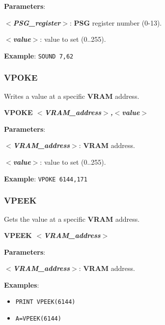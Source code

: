 \documentclass[a4paper,11pt]{article}
\begin{document}
    \textbf{Parameters}:

    \hspace{1cm}\textbf{\textit{$<$PSG\_register$>$}}: \textbf{PSG} register
    number (0-13).

    \hspace{1cm}\textbf{\textit{$<$value$>$}}: value to set (0..255).

    \textbf{Example}: \texttt{SOUND 7,62}

    \subsubsection{{\color{blue}VPOKE}}
    Writes a value at a specific \textbf{VRAM} address.

    \hspace{1.9cm}\textbf{VPOKE \textit{$<$VRAM\_address$>$,$<$value$>$}}

    \textbf{Parameters}:

    \hspace{1cm}\textbf{\textit{$<$VRAM\_address$>$}}: \textbf{VRAM} address.

    \hspace{1cm}\textbf{\textit{$<$value$>$}}: value to set (0..255).

    \textbf{Example}: \texttt{VPOKE 6144,171}

    \subsubsection{{\color{blue}VPEEK}}
    Gets the value at a specific \textbf{VRAM} address.

    \hspace{1.9cm}\textbf{VPEEK \textit{$<$VRAM\_address$>$}}

    \textbf{Parameters}:

    \hspace{1cm}\textbf{\textit{$<$VRAM\_address$>$}}: \textbf{VRAM} address.

    \textbf{Examples}:
    \begin{itemize}
        \item \texttt{PRINT VPEEK(6144)}
        \item \texttt{A=VPEEK(6144)}
    \end{itemize}
\end{document}
